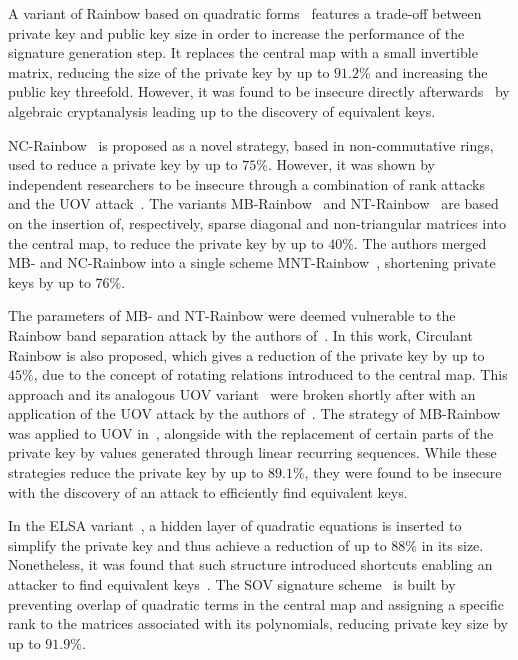 \documentclass[12pt, a4paper, oneside]{memoir}
\theoremstyle{definition}
\begin{document}
A variant of Rainbow based on quadratic forms~\cite{Yasuda:201306} features a trade-off between private key and public key size in order to increase the performance of the signature generation step. It replaces the central map with a small invertible matrix, reducing the size of the private key by up to $91.2\%$ and increasing the public key threefold. However, it was found to be insecure directly afterwards~\cite{Hashimoto:201410} by algebraic cryptanalysis leading up to the discovery of equivalent keys.

NC-Rainbow~\cite{Yasuda:201202} is proposed as a novel strategy, based in non-commutative rings, used to reduce a private key by up to $75\%$. However, it was shown by independent researchers to be insecure through a combination of rank attacks and the UOV attack~\cite{Thomae:201209,Hashimoto:201302}. The variants MB-Rainbow~\cite{Yasuda:201305} and NT-Rainbow~\cite{Yasuda:201404} are based on the insertion of, respectively, sparse diagonal and non-triangular matrices into the central map, to reduce the private key by up to $40\%$. The authors merged MB- and NC-Rainbow into a single scheme MNT-Rainbow~\cite{Yasuda:201409}, shortening private keys by up to $76\%$. 

The parameters of MB- and NT-Rainbow were deemed vulnerable to the Rainbow band separation attack by the authors of~\cite{Peng:201706}. In this work, Circulant Rainbow is also proposed, which gives a reduction of the private key by up to $45\%$, due to the concept of rotating relations introduced to the central map. This approach and its analogous UOV variant~\cite{Peng:201803} were broken shortly after with an application of the UOV attack by the authors of~\cite{Hashimoto:201903}. The strategy of MB-Rainbow was applied to UOV in~\cite{Tan:201511}, alongside with the replacement of certain parts of the private key by values generated through linear recurring sequences. While these strategies reduce the private key by up to $89.1\%$, they were found to be insecure~\cite{Park:201803} with the discovery of an attack to efficiently find equivalent keys. 

In the ELSA variant~\cite{Shim:201712}, a hidden layer of quadratic equations is inserted to simplify the private key and thus achieve a reduction of up to $88\%$ in its size. Nonetheless, it was found that such structure introduced shortcuts enabling an attacker to find equivalent keys~\cite{Hashimoto:201909}. The SOV signature scheme~\cite{Shim:202001} is built by preventing overlap of quadratic terms in the central map and assigning a specific rank to the matrices associated with its polynomials, reducing private key size by up to $91.9\%$.
\end{document}
